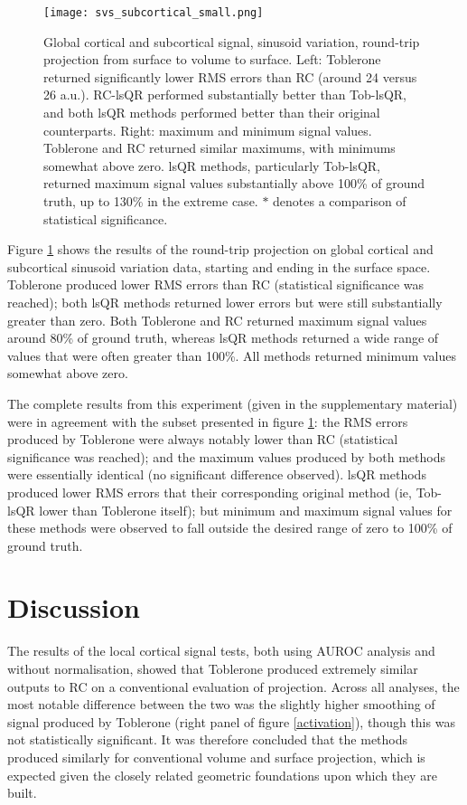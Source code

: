 \documentclass[review]{elsarticle}
\begin{document}
\begin{figure}[H]
\centering
\texttt{[image: svs\_subcortical\_small.png]}
\caption{Global cortical and subcortical signal, sinusoid variation, round-trip projection from surface to volume to surface. Left: Toblerone returned significantly lower RMS errors than RC (around 24 versus 26 a.u.). RC-lsQR performed substantially better than Tob-lsQR, and both lsQR methods performed better than their original counterparts. Right: maximum and minimum signal values. Toblerone and RC returned similar maximums, with minimums somewhat above zero. lsQR methods, particularly Tob-lsQR, returned maximum signal values substantially above 100\% of ground truth, up to 130\% in the extreme case. $*$ denotes a comparison of statistical significance.}
\label{svs_subcortical_small}
\end{figure}

Figure \ref{svs_subcortical_small} shows the results of the round-trip projection on global cortical and subcortical sinusoid variation data, starting and ending in the surface space. Toblerone produced lower RMS errors than RC (statistical significance was reached); both lsQR methods returned lower errors but were still substantially greater than zero. Both Toblerone and RC returned maximum signal values around 80\% of ground truth, whereas lsQR methods returned a wide range of values that were often greater than 100\%. All methods returned minimum values somewhat above zero. 

The complete results from this experiment (given in the supplementary material) were in agreement with the subset presented in figure \ref{svs_subcortical_small}: the RMS errors produced by Toblerone were always notably lower than RC (statistical significance was reached); and the maximum values produced by both methods were essentially identical (no significant difference observed). lsQR methods produced lower RMS errors that their corresponding original method (ie, Tob-lsQR lower than Toblerone itself); but minimum and maximum signal values for these methods were observed to fall outside the desired range of zero to 100\% of ground truth. 

\section{Discussion}

The results of the local cortical signal tests, both using AUROC analysis and without normalisation, showed that Toblerone produced extremely similar outputs to RC on a conventional evaluation of projection. Across all analyses, the most notable difference between the two was the slightly higher smoothing of signal produced by Toblerone (right panel of figure \ref{activation}), though this was not statistically significant. It was therefore concluded that the methods produced similarly for conventional volume and surface projection, which is expected given the closely related geometric foundations upon which they are built. 
\end{document}
